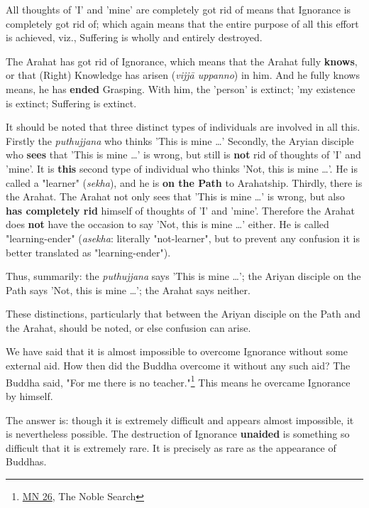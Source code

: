All thoughts of 'I' and 'mine' are completely got rid of means that Ignorance is completely got rid of; which again means that the entire purpose of all this effort is achieved, viz., Suffering is wholly and entirely destroyed.

The Arahat has got rid of Ignorance, which means that the Arahat fully \textbf{knows}, or that (Right) Knowledge has arisen (\emph{vijjā uppanno}) in him. And he fully knows means, he has \textbf{ended} Grasping. With him, the 'person' is extinct; 'my existence is extinct; Suffering is extinct.

It should be noted that three distinct types of individuals are involved in all this. Firstly the \emph{puthujjana} who thinks 'This is mine \ldots\hspace{0pt}' Secondly, the Aryian disciple who \textbf{sees} that 'This is mine \ldots\hspace{0pt}' is wrong, but still is \textbf{not} rid of thoughts of 'I' and 'mine'. It is \textbf{this} second type of individual who thinks 'Not, this is mine \ldots\hspace{0pt}'. He is called a "learner" (\emph{sekha}), and he is \textbf{on the Path} to Arahatship. Thirdly, there is the Arahat. The Arahat not only sees that 'This is mine \ldots\hspace{0pt}' is wrong, but also \textbf{has completely rid} himself of thoughts of 'I' and 'mine'. Therefore the Arahat does \textbf{not} have the occasion to say 'Not, this is mine \ldots\hspace{0pt}' either. He is called "learning-ender" (\emph{asekha}: literally "not-learner", but to prevent any confusion it is better translated as "learning-ender").

Thus, summarily: the \emph{puthujjana} says 'This is mine \ldots\hspace{0pt}'; the Ariyan disciple on the Path says 'Not, this is mine \ldots\hspace{0pt}'; the Arahat says neither.

These distinctions, particularly that between the Ariyan disciple on the Path and the Arahat, should be noted, or else confusion can arise.

We have said that it is almost impossible to overcome Ignorance without some external aid. How then did the Buddha overcome it without any such aid? The Buddha said, "For me there is no teacher."\footnote{\href{https://suttacentral.net/mn26/en/bodhi}{MN 26}, The Noble Search} This means he overcame Ignorance by himself.

The answer is: though it is extremely difficult and appears almost impossible, it is nevertheless possible. The destruction of Ignorance \textbf{unaided} is something so difficult that it is extremely rare. It is precisely as rare as the appearance of Buddhas.
